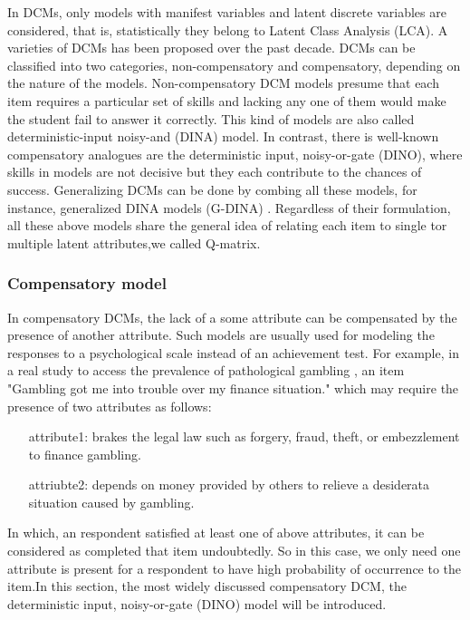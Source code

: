 \documentclass[12pt]{article}
\begin{document}
In DCMs, only models with manifest variables and latent discrete variables are considered, that is, statistically they belong to Latent Class Analysis (LCA). A varieties of DCMs has been proposed over the past decade. DCMs can be classified into two categories, non-compensatory and compensatory, depending on the nature of the models. Non-compensatory DCM models presume that each item requires a particular set of skills and lacking any one of them would make the student fail to answer it correctly. This kind of models are also called deterministic-input noisy-and (DINA) model\cite{de2009dina}. In contrast, there is well-known compensatory analogues are the deterministic input, noisy-or-gate (DINO)\cite{templin2006measurement}, where skills in models are not decisive but they each contribute to the chances of success. Generalizing DCMs can be done by combing all these models, for instance,  generalized DINA models (G-DINA) \cite{de2011generalized}. Regardless of their formulation, all these above models share the general idea of relating each item to single tor multiple latent attributes,we called Q-matrix.
\subsubsection{Compensatory model}

 In compensatory DCMs, the lack of a some attribute can be
compensated by the presence of another attribute. Such models are usually
used for modeling the responses to a psychological scale instead of an achievement test.
For example, in a real study to access the prevalence of pathological gambling \cite{templin2010diagnostic}, an item "Gambling got me into trouble over my finance
situation." which may require the presence of two attributes as follows:
\begin{itemize}
	\item[attribute1:] brakes the legal law such as forgery, fraud, theft, or embezzlement to finance gambling.
	\item[attriubte2:] depends on money provided by others to relieve a desiderata situation caused by gambling.	
\end{itemize}

 
In which, an respondent satisfied at least one of above attributes, it can be considered as completed that item undoubtedly. So in this case, we only need one attribute is present for a respondent to have high probability of occurrence to the item.In this section, the most widely discussed compensatory DCM, the deterministic input, noisy-or-gate (DINO) model \cite{templin2006measurement} will be introduced. 
\end{document}
